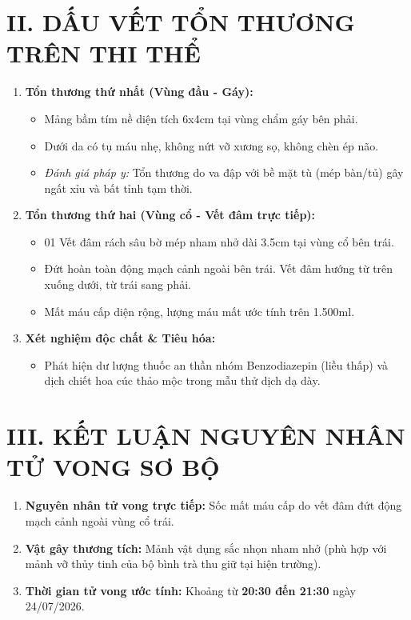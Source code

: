 \documentclass[12pt,a4paper]{article}
\begin{document}
\section*{II. DẤU VẾT TỔN THƯƠNG TRÊN THI THỂ}
\begin{enumerate}[label=\arabic*., leftmargin=1.5cm]
    \item \textbf{Tổn thương thứ nhất (Vùng đầu - Gáy):}
    \begin{itemize}[leftmargin=0.8cm]
        \item Mảng bầm tím nề diện tích 6x4cm tại vùng chẩm gáy bên phải.
        \item Dưới da có tụ máu nhẹ, không nứt vỡ xương sọ, không chèn ép não.
        \item \textit{Đánh giá pháp y:} Tổn thương do va đập với bề mặt tù (mép bàn/tủ) gây ngất xỉu và bất tỉnh tạm thời.
    \end{itemize}

    \item \textbf{Tổn thương thứ hai (Vùng cổ - Vết đâm trực tiếp):}
    \begin{itemize}[leftmargin=0.8cm]
        \item 01 Vết đâm rách sâu bờ mép nham nhở dài 3.5cm tại vùng cổ bên trái.
        \item Đứt hoàn toàn động mạch cảnh ngoài bên trái. Vết đâm hướng từ trên xuống dưới, từ trái sang phải.
        \item Mất máu cấp diện rộng, lượng máu mất ước tính trên 1.500ml.
    \end{itemize}
    
    \item \textbf{Xét nghiệm độc chất \& Tiêu hóa:}
    \begin{itemize}[leftmargin=0.8cm]
        \item Phát hiện dư lượng thuốc an thần nhóm Benzodiazepin (liều thấp) và dịch chiết hoa cúc thảo mộc trong mẫu thử dịch dạ dày.
    \end{itemize}
\end{enumerate}

\section*{III. KẾT LUẬN NGUYÊN NHÂN TỬ VONG SƠ BỘ}
\begin{enumerate}[label=\arabic*., leftmargin=1.5cm]
    \item \textbf{Nguyên nhân tử vong trực tiếp:} Sốc mất máu cấp do vết đâm đứt động mạch cảnh ngoài vùng cổ trái.
    \item \textbf{Vật gây thương tích:} Mảnh vật dụng sắc nhọn nham nhở (phù hợp với mảnh vỡ thủy tinh của bộ bình trà thu giữ tại hiện trường).
    \item \textbf{Thời gian tử vong ước tính:} Khoảng từ \textbf{20:30 đến 21:30} ngày 24/07/2026.
\end{enumerate}
\end{document}
